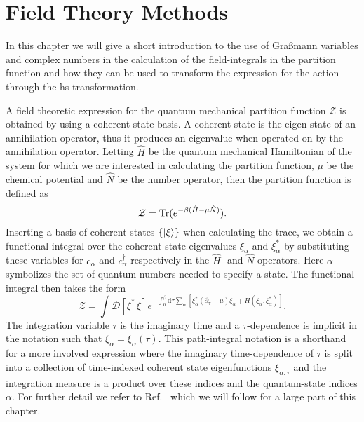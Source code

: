 \chapter{Field Theory Methods}
\label{chap:Field}
%
\noindent In this chapter we will give a short introduction to the use of Gra\ss mann variables
and complex numbers in the calculation of the field-integrals in the
partition function and how they can be used to transform the
expression for the action through the \ac{hs} transformation.

A field theoretic expression for the quantum mechanical partition function $\mathcal{Z}$
is obtained by using a coherent state basis. A coherent state is the eigen-state of an annihilation operator, thus it
produces an eigenvalue when operated on by the annihilation operator. Letting $\hat{H}$ be the quantum mechanical
Hamiltonian of the system for which we are interested in calculating the partition function, $\mu$ be the chemical
potential and $\hat{N}$ be the number operator, then the partition function is defined as
\begin{equation}
    \label{eq:Field:partitionFunction}
    \mathcal{Z} = \operatorname{Tr}(e^{-\beta(\hat{H}-\mu\hat{N})}).
\end{equation}
Inserting a basis of coherent states $\{\lvert \xi \rangle\}$ when calculating the trace, we obtain a functional integral over
the coherent state eigenvalues $\xi_\alpha$ and $\xi^\ast_\alpha$ by substituting these variables for
$c_\alpha$ and $c_\alpha^\dagger$ respectively in the $\hat{H}$- and $\hat{N}$-operators. Here $\alpha$ symbolizes the set of quantum-numbers needed to specify
a state. The functional integral then takes the form
\begin{equation}
    \label{eq:Field:fieldPartition}
    \mathcal{Z} = \int\!\mathcal{D}[\xi^\ast\,\xi]e^{-\int_0^\beta\!\mathrm{d}\tau\sum_\alpha [\xi^\ast_\alpha(\partial_\tau-\mu)\xi_\alpha + H(\xi_\alpha,\xi_\alpha^\ast)]}.
\end{equation}
The integration variable $\tau$ is the imaginary time and a $\tau$-dependence is implicit in the notation such that $\xi_\alpha = \xi_\alpha(\tau)$.
This path-integral notation is a shorthand for a more involved expression where the imaginary time-dependence of $\tau$ is
split into a collection of time-indexed coherent state eigenfunctions $\xi_{\alpha,\tau}$ and the integration measure
is a product over these indices and the quantum-state indices $\alpha$. For further detail we refer to Ref.~\cite{NegeleOrland98}
which we will follow for a large part of this chapter.

